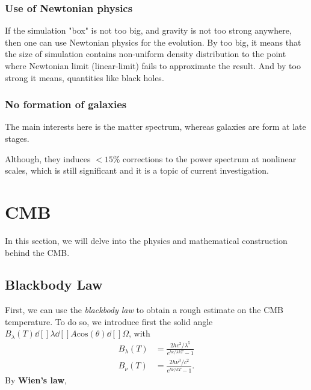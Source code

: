 \documentclass[a4paper, 12pt]{article}
\begin{document}
{{                \subsubsection{Use of Newtonian physics}%
                  \label{sub:Use of Newtonian physics}
                  If the simulation "box" is not too big, and
                  gravity is not too strong anywhere, then one
                  can use Newtonian physics for the evolution. By
                  too big, it means that the size of simulation
                 contains non-uniform density distribution to the
                 point where Newtonian limit (linear-limit) fails
                 to approximate the result. And by too strong it
                 means, quantities like black holes. 

                \subsubsection{No formation of galaxies}%
                  \label{sub:No formation of galaxies}
                  The main interests here is the matter spectrum,
                  whereas galaxies are form at late stages. 

                  Although, they induces \( < 15
                  \percent \) corrections to the power spectrum
                  at nonlinear scales, which is still significant
                  and it is a topic of current investigation.

      \section{CMB}%
        \label{sec:CMB}
        In this section, we will delve into the physics and
        mathematical construction behind the CMB. 

        \subsection{Blackbody Law}%
          \label{sub:Blackbody Law}
          First, we can use the \textit{blackbody law} to obtain a
          rough estimate on the CMB temperature. To do so, we
          introduce first the solid angle \( B_{\lambda} (T)
          \dd[]{\lambda} \dd[]{A} \mathrm{cos}(\theta)
          \dd[]{\Omega} \), with 
          \begin{align}
            \label{planck temperature distribution}
            B_{\lambda}(T) &= \frac{2h c^2 /
            \lambda^5}{e^{hc/ \lambda k T} - 1 } \\ 
            \label{planck temperature distribution in frequency} 
            B_{\nu}(T) &= \frac{2h \nu^3 /
            c^2}{e^{h\nu/ k T} - 1 }.
          \end{align}
          By \textbf{Wien's law},

}}
\end{document}
